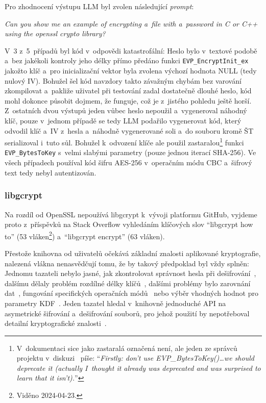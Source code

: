 Pro zhodnocení výstupu LLM byl zvolen následující \textit{prompt}:

\begin{displayquote}
\textit{Can you show me an example of encrypting a~file with a~password in C or C++ using the openssl crypto library?}
\end{displayquote}

V~3 z~5~případů byl kód v~odpovědi katastrofální: Heslo bylo v~textové podobě a~bez jakékoli kontroly jeho délky přímo předáno funkci \texttt{EVP\_EncryptInit\_ex} jakožto klíč a~pro inicializační vektor byla zvolena výchozí hodnota NULL (tedy nulový IV). Bohužel šel kód navzdory takto závažným chybám bez varování zkompilovat a~pakliže uživatel při testování zadal dostatečně dlouhé heslo, kód mohl dokonce působit dojmem, že funguje, což je z~jistého pohledu ještě horší. Z~ostatních dvou výstupů jeden vůbec heslo nepoužil a~vygeneroval náhodný klíč, pouze v~jednom případě se tedy LLM podařilo vygenerovat kód, který odvodil klíč a~IV z~hesla a~náhodně vygenerované soli a~do souboru kromě ŠT serializoval i~tuto sůl. Bohužel k~odvození klíče ale použil zastaralou\footnote{V~dokumentaci sice jako zastaralá označená není, ale jeden ze správců projektu v~diskuzi~\cite{openssl-disc-23198} píše: ``\textit{Firstly: don't use EVP\_BytesToKey()\dots we should deprecate it (actually I~thought it already was deprecated and was surprised to learn that it isn't).}''} funkci \texttt{EVP\_BytesToKey} s~velmi slabými parametry (pouze jednou iterací SHA-256). Ve všech případech používal kód šifru AES-256 v~operačním módu CBC a~šifrový text tedy nebyl autentizován.

\subsubsection*{libgcrypt}

Na rozdíl od OpenSSL nepoužívá libgcrypt k~vývoji platformu GitHub, vyjdeme proto z~pří\-spěv\-ků na Stack Overflow vyhledáním klíčových slov ``libgcrypt how to'' (53 vláken\footnote{Viděno 2024-04-23.}) a~``libgcrypt encrypt'' (63 vláken).

Přestože knihovna od uživatelů očekává základní znalosti aplikované kryptografie, nalezená vlákna nenasvědčují tomu, že by takový předpoklad byl vždy splněn: Jednomu tazateli nebylo jasné, jak zkontrolovat správnost hesla při dešifrování~\cite{so-14548748}, dalšímu dělaly problém rozdílné délky klíčů~\cite{so-17711691}, dalšími problémy bylo zarovnání dat~\cite{so-56266972, so-35835927}, fungování specifických operačních módů~\cite{so-21882115} nebo výběr vhodných hodnot pro parametry KDF~\cite{so-14583733}. Jeden tazatel hledal v~knihovně jednoduché API na asymetrické šifrování a~dešifrování souborů, pro jehož použití by nepotřeboval detailní kryptografické znalosti~\cite{so-4124182}.


